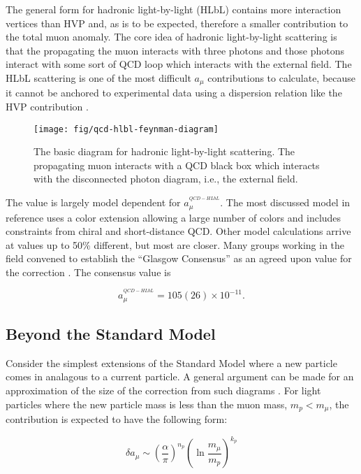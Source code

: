 The general form for hadronic light-by-light (HLbL) contains more interaction vertices than HVP and, as is to be expected, therefore a smaller contribution to the total muon anomaly.  The core idea of hadronic light-by-light scattering is that the propagating the muon interacts with three photons and those photons interact with some sort of QCD loop which interacts with the external field.  The HLbL scattering is one of the most difficult $a_\mu$ contributions to calculate, because it cannot be anchored to experimental data using a dispersion relation like the HVP contribution \cite{the-muon-g-2}.

\begin{figure}
\centering
\texttt{[image: fig/qcd-hlbl-feynman-diagram]}
\caption{The basic diagram for hadronic light-by-light scattering.  The propagating muon interacts with a QCD black box which interacts with the disconnected photon diagram, i.e., the external field. \label{fig:qcd-hlbl-feynman-diagram}}
\end{figure}

The value is largely model dependent for $a_\mu^{^{QCD-HLbL}}$.  The most discussed model in reference \cite{amm-of-muon} uses a color extension allowing a large number of colors and includes constraints from chiral and short-distance QCD.  Other model calculations arrive at values up to 50\% different, but most are closer.  Many groups working in the field convened to establish the ``Glasgow Consensus'' as an agreed upon value for the correction \cite{e989-tdr}.  The consensus value is

\begin{equation}
\label{eqn:qcd-hlbl-total}
a_\mu^{^{QCD-HLbL}} = 105(26) \times 10^{-11}.
\end{equation}

\subsection{Beyond the Standard Model}

Consider the simplest extensions of the Standard Model where a new particle comes in analagous to a current particle.  A general argument can be made for an approximation of the size of the correction from such diagrams \cite{the-muon-g-2}.  For light particles where the new particle mass is less than the muon mass, $m_p < m_\mu$, the contribution is expected to have the following form:

\begin{equation}
\label{eqn:bsm-general-small-m}
\delta a_\mu \sim \left(\frac{\alpha}{\pi}\right)^{n_p} \left( \ln{\frac{m_\mu}{m_p}} \right)^{k_p}
\end{equation}

